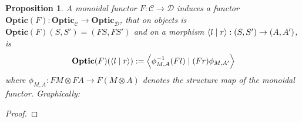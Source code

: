 \documentclass[11pt,letterpaper]{article}
\theoremstyle{plain}
\newtheorem{proposition}[theorem]{Proposition}
\theoremstyle{definition}
\newcommand{\C}{\mathscr{C}}
\newcommand{\D}{\mathscr{D}}
\newcommand{\Optic}{\mathbf{Optic}}
\newcommand{\rep}[2]{{\ensuremath \left\langle #1 \mid #2 \right\rangle}}
\begin{document}
\begin{proposition}\label{prop:change-of-action-monoidal}
  A monoidal functor $F : \C \to \D$ induces a functor $\Optic(F) : \Optic_\C \to \Optic_\D$, that on objects is $\Optic(F)(S, S') = (FS, FS')$ and on a morphism $\rep{l}{r} : (S, S') \to (A, A')$, is
  \begin{align*}
    \Optic(F)(\rep{l}{r}) := \rep{\phi^{-1}_{M,A} (Fl)}{(Fr) \phi_{M,A'}}
  \end{align*}
  where $\phi_{M,A} : FM \otimes FA \to F(M \otimes A)$ denotes the structure map of the monoidal functor. Graphically:
  \begin{center}
    
  \end{center}
\end{proposition}
\begin{proof}


\end{proof}
\end{document}
